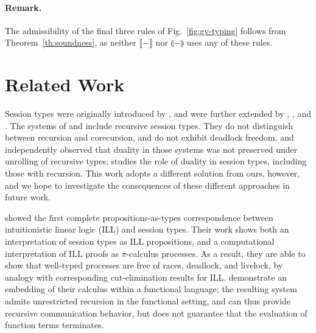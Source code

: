 \documentclass[orivec,envcountsame]{llncs}
\newcommand{\tocp}[1]{\llbracket #1 \rrbracket}
\newcommand{\togv}[1]{\llparenthesis #1 \rrparenthesis}
\begin{document}
\paragraph{Remark.}
The admissibility of the final three rules of Fig.~\ref{fig:gv-typing} follows from
Theorem~\ref{th:soundness}, as neither $\tocp{-}$ nor $\togv{-}$ uses any of these rules.


\section{Related Work}\label{sec:related}

Session types were originally introduced by \citet{Honda93}, and were further extended by
\citet{Takeuchi94}, \citet{Honda98}, and \citet{Yoshida07}. The systems of \citet{Honda98} and
\citet{Yoshida07} include recursive session types. They do not distinguish between recursion and
corecursion, and do not exhibit deadlock freedom. \citet{Bono12} and \citet{Bernardi13}
independently observed that duality in those systems was not preserved under unrolling of recursive
types; \citet{Bernardi14} studies the role of duality in session types, including those with
recursion.  This work adopts a different solution from ours, however, and we hope to investigate the
consequences of these different approaches in future work.

\citet{CairesPfenning10} showed the first complete propositions-as-types correspondence between
intuitionistic linear logic (ILL) and session types. Their work shows both an interpretation of
session types as ILL propositions, and a computational interpretation of ILL proofs as
$\pi$-calculus processes. As a result, they are able to show that well-typed processes are free of
races, deadlock, and livelock, by analogy with corresponding cut-elimination results for
ILL. \citet{Toninho13} demonstrate an embedding of their calculus within a functional language; the
resulting system admits unrestricted recursion in the functional setting, and can thus provide
recursive communication behavior, but does not guarantee that the evaluation of function terms
terminates.
\end{document}
